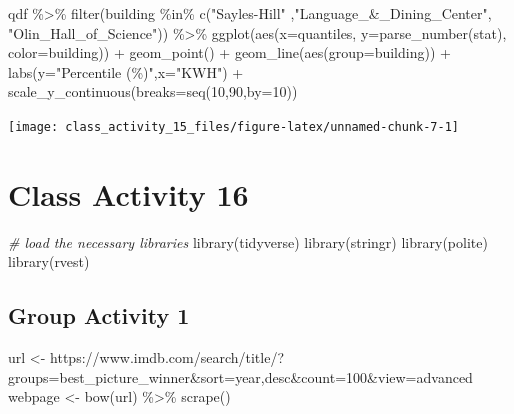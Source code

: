 \documentclass[
]{book}
\newenvironment{Shaded}{\begin{snugshade}}{\end{snugshade}}
\newcommand{\AttributeTok}[1]{\textcolor[rgb]{0.77,0.63,0.00}{#1}}
\newcommand{\CommentTok}[1]{\textcolor[rgb]{0.56,0.35,0.01}{\textit{#1}}}
\newcommand{\DecValTok}[1]{\textcolor[rgb]{0.00,0.00,0.81}{#1}}
\newcommand{\FunctionTok}[1]{\textcolor[rgb]{0.00,0.00,0.00}{#1}}
\newcommand{\NormalTok}[1]{#1}
\newcommand{\OtherTok}[1]{\textcolor[rgb]{0.56,0.35,0.01}{#1}}
\newcommand{\SpecialCharTok}[1]{\textcolor[rgb]{0.00,0.00,0.00}{#1}}
\newcommand{\StringTok}[1]{\textcolor[rgb]{0.31,0.60,0.02}{#1}}
\begin{document}
\begin{Shaded}
\begin{Highlighting}[]
\NormalTok{qdf }\SpecialCharTok{\%\textgreater{}\%} 
  \FunctionTok{filter}\NormalTok{(building }\SpecialCharTok{\%in\%} \FunctionTok{c}\NormalTok{(}\StringTok{"Sayles{-}Hill"}\NormalTok{ ,}\StringTok{"Language\_\&\_Dining\_Center"}\NormalTok{, }\StringTok{"Olin\_Hall\_of\_Science"}\NormalTok{))  }\SpecialCharTok{\%\textgreater{}\%}  
  \FunctionTok{ggplot}\NormalTok{(}\FunctionTok{aes}\NormalTok{(}\AttributeTok{x=}\NormalTok{quantiles, }\AttributeTok{y=}\FunctionTok{parse\_number}\NormalTok{(stat), }\AttributeTok{color=}\NormalTok{building)) }\SpecialCharTok{+}
  \FunctionTok{geom\_point}\NormalTok{() }\SpecialCharTok{+} 
  \FunctionTok{geom\_line}\NormalTok{(}\FunctionTok{aes}\NormalTok{(}\AttributeTok{group=}\NormalTok{building)) }\SpecialCharTok{+} 
  \FunctionTok{labs}\NormalTok{(}\AttributeTok{y=}\StringTok{"Percentile (\%)"}\NormalTok{,}\AttributeTok{x=}\StringTok{"KWH"}\NormalTok{) }\SpecialCharTok{+}
  \FunctionTok{scale\_y\_continuous}\NormalTok{(}\AttributeTok{breaks=}\FunctionTok{seq}\NormalTok{(}\DecValTok{10}\NormalTok{,}\DecValTok{90}\NormalTok{,}\AttributeTok{by=}\DecValTok{10}\NormalTok{))}
\end{Highlighting}
\end{Shaded}

\texttt{[image: class\_activity\_15\_files/figure-latex/unnamed-chunk-7-1]}

\hypertarget{class-activity-16}{%
\chapter{Class Activity 16}\label{class-activity-16}}

\begin{Shaded}
\begin{Highlighting}[]
\CommentTok{\# load the necessary libraries}
\FunctionTok{library}\NormalTok{(tidyverse)}
\FunctionTok{library}\NormalTok{(stringr)}
\FunctionTok{library}\NormalTok{(polite)}
\FunctionTok{library}\NormalTok{(rvest)}
\end{Highlighting}
\end{Shaded}

\hypertarget{group-activity-1-3}{%
\section{Group Activity 1}\label{group-activity-1-3}}

\begin{Shaded}
\begin{Highlighting}[]
\NormalTok{url }\OtherTok{\textless{}{-}} \StringTok{\textquotesingle{}https://www.imdb.com/search/title/?groups=best\_picture\_winner\&sort=year,desc\&count=100\&view=advanced\textquotesingle{}}
\NormalTok{webpage }\OtherTok{\textless{}{-}} \FunctionTok{bow}\NormalTok{(url) }\SpecialCharTok{\%\textgreater{}\%} \FunctionTok{scrape}\NormalTok{()}
\end{Highlighting}
\end{Shaded}
\end{document}

